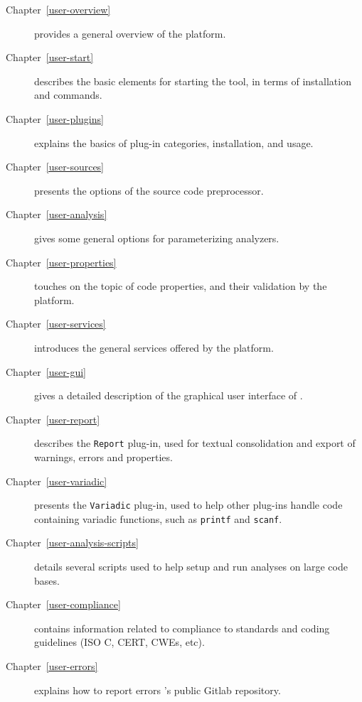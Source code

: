 \begin{description}
\item[Chapter~\ref{user-overview}] provides a general overview of the platform.
\item[Chapter~\ref{user-start}] describes the basic elements for starting the
  tool, in terms of installation and commands.
\item[Chapter~\ref{user-plugins}] explains the basics of plug-in categories,
  installation, and usage.
\item[Chapter~\ref{user-sources}] presents the options of the source code
  preprocessor.
\item[Chapter~\ref{user-analysis}] gives some general options for parameterizing
  analyzers.
\item[Chapter~\ref{user-properties}] touches on the topic of code properties,
  and their validation by the platform.
\item[Chapter~\ref{user-services}] introduces the general services offered by
  the platform.
\item[Chapter~\ref{user-gui}] gives a detailed description of the graphical
  user interface of \FramaC.
\item[Chapter~\ref{user-report}] describes the \texttt{Report} plug-in, used
  for textual consolidation and export of warnings, errors and properties.
\item[Chapter~\ref{user-variadic}] presents the \texttt{Variadic} plug-in,
  used to help other plug-ins handle code containing variadic functions, such
  as \texttt{printf} and \texttt{scanf}.
\item[Chapter~\ref{user-analysis-scripts}] details several scripts used to
  help setup and run analyses on large code bases.
\item[Chapter~\ref{user-compliance}] contains information related to compliance
  to standards and coding guidelines (ISO C, CERT, CWEs, etc).
\item[Chapter~\ref{user-errors}] explains how to report errors \via \FramaC's
  public Gitlab repository.
\end{description}
